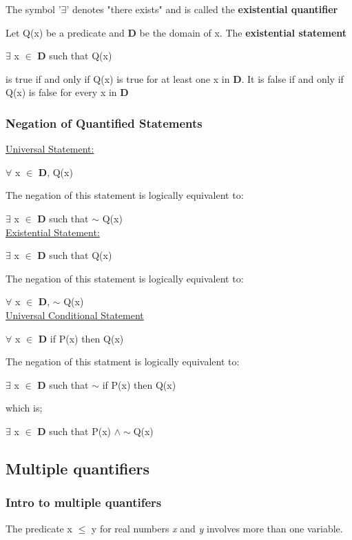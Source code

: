 \documentclass{article}
\begin{document}
The symbol '$\exists$' denotes "there exists" and is called the \textbf{existential quantifier}

Let Q(x) be a predicate and \textbf{D} be the domain of x. The \textbf{existential statement}

$\exists$ x $\in$ \textbf{D} such that Q(x)

is true if and only if Q(x) is true for at least one x in \textbf{D}. It is false if and only if Q(x) is false for every x in \textbf{D}

\subsubsection{Negation of Quantified Statements}

\underline{Universal Statement:}

$\forall$ x $\in$ \textbf{D}, Q(x)

The negation of this statement is logically equivalent to:

$\exists$ x $\in$ \textbf{D} such that $\sim$ Q(x) \\

\underline{Existential Statement:}

$\exists$ x $\in$ \textbf{D} such that Q(x) 

The negation of this statement is logically equivalent to:

$\forall$ x $\in$ \textbf{D}, $\sim$ Q(x) \\

\underline{Universal Conditional Statement}

$\forall$ x $\in$ \textbf{D} if P(x) then Q(x)

The negation of this statment is logically equivalent to:

$\exists$ x $\in$ \textbf{D} such that $\sim$ if P(x) then Q(x) 

which is;

$\exists$ x $\in$ \textbf{D} such that P(x) $\wedge \sim$Q(x)

\subsection{Multiple quantifiers}

\subsubsection{Intro to multiple quantifers}

The predicate x $\leq$ y for real numbers \textit{x} and \textit{y} involves more than one variable.
\end{document}
